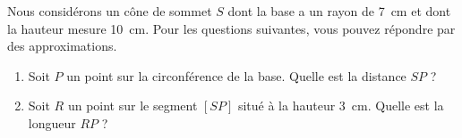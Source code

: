 
\begin{exercice}\label{exo2smath-0182}

    Nous considérons un cône de sommet \( S\) dont la base a un rayon de \SI{7}{\centi\meter} et dont la hauteur mesure \SI{10}{\centi\meter}. Pour les questions suivantes, vous pouvez répondre par des approximations.
    \begin{enumerate}
        \item
            Soit \( P\) un point sur la circonférence de la base. Quelle est la distance \( SP\) ?
        \item
            Soit \( R\) un point sur le segment \( [SP]\) situé à la hauteur \SI{3}{\centi\meter}. Quelle est la longueur \( RP\) ?
    \end{enumerate}

\end{exercice}
